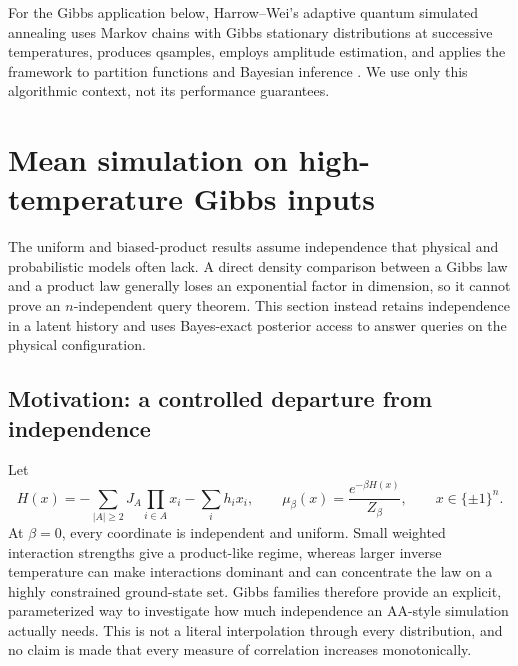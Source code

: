 \documentclass[11pt]{article}
\theoremstyle{definition}\newtheorem{definition}[theorem]{Definition}
\theoremstyle{remark}\newtheorem{remark}[theorem]{Remark}
\begin{document}
For the Gibbs application below, Harrow--Wei's adaptive quantum simulated annealing uses Markov chains with Gibbs stationary distributions at successive temperatures, produces qsamples, employs amplitude estimation, and applies the framework to partition functions and Bayesian inference \cite{HW20}. We use only this algorithmic context, not its performance guarantees.

\section{Mean simulation on high-temperature Gibbs inputs}\label{sec:gibbs}
The uniform and biased-product results assume independence that physical and probabilistic models often lack. A direct density comparison between a Gibbs law and a product law generally loses an exponential factor in dimension, so it cannot prove an \(n\)-independent query theorem. This section instead retains independence in a latent history and uses Bayes-exact posterior access to answer queries on the physical configuration.

\subsection{Motivation: a controlled departure from independence}
Let
\[
 H(x)=-\sum_{|A|\ge2}J_A\prod_{i\in A}x_i-\sum_ih_ix_i,\qquad
 \mu_\beta(x)=\frac{e^{-\beta H(x)}}{Z_\beta},\qquad x\in\{\pm1\}^n.
\]
At \(\beta=0\), every coordinate is independent and uniform. Small weighted interaction strengths give a product-like regime, whereas larger inverse temperature can make interactions dominant and can concentrate the law on a highly constrained ground-state set. Gibbs families therefore provide an explicit, parameterized way to investigate how much independence an AA-style simulation actually needs. This is not a literal interpolation through every distribution, and no claim is made that every measure of correlation increases monotonically.
\end{document}
